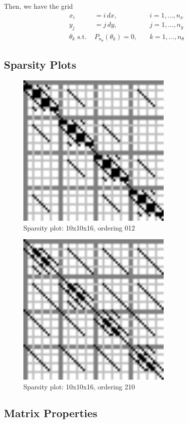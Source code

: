 \documentclass[10pt]{article}
\begin{document}
\begin{multicols}{2}
Then, we have the grid
\begin{align}
	x_i &= i\,dx, &\quad i=1,\ldots,n_x \\
	y_j &= j\,dy, &\quad j=1,\ldots,n_y \\
	\theta_k \,\, \mbox{s.t.}\,\, 
	&P_{n_\theta}(\theta_k) = 0, &\quad k=1,\ldots,n_\theta
\end{align}

\subsection{Sparsity Plots}
\begin{figure}[H]
	\centering
	\includegraphics[width=3in]{../img/sparsity/int_small_4x4x4_012.png}
	\caption{Sparsity plot: 10x10x16, ordering 012}
\end{figure}

\begin{figure}[H]
	\centering
	\includegraphics[width=3in]{../img/sparsity/int_small_4x4x4_210.png}
	\caption{Sparsity plot: 10x10x16, ordering 210}
\end{figure}
\subsection{Matrix Properties}

\end{multicols}
\end{document}
